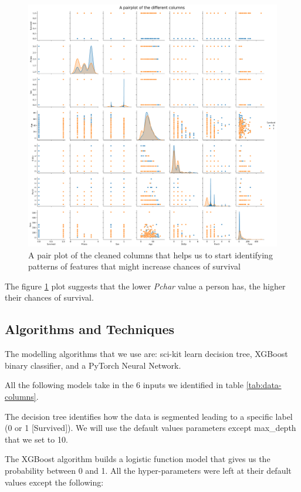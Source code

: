 \documentclass{article}
\begin{document}
\begin{figure}[H]
    \includegraphics[width=\linewidth]{pairplot}
    \caption{A pair plot of the cleaned columns that helps us to start identifying patterns
    of features that might increase chances of survival}
    \label{fig: pair-plot}
\end{figure}

The figure \ref{fig: pair-plot} plot suggests that the lower \emph{Pchar} value a person has, 
the higher their chances of survival.

\subsection{Algorithms and
Techniques}\label{algorithms-and-techniques}

The modelling algorithms that we use are: sci-kit learn decision tree, XGBoost binary classifier,
and a PyTorch Neural Network.

All the following models take in the 6 inputs we identified in table \ref{tab:data-columns}.

The decision tree identifies how the data is segmented leading to a specific label (0 or 1 [Survived]).
We will use the default values parameters except max\_depth that we set to 10.

The XGBoost algorithm builds a logistic function model that gives us the probability between 0 and 1.
All the hyper-parameters were left at their default values except the following:
\end{document}
